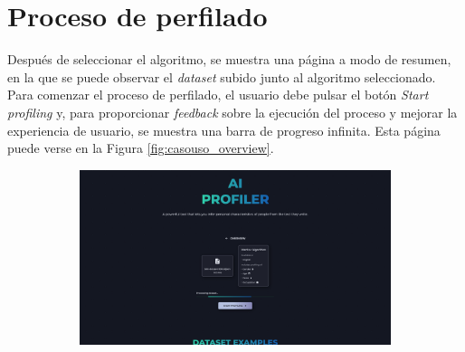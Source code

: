 \section{Proceso de perfilado}
\label{sec:casouso_perfilado}

Después de seleccionar el algoritmo, se muestra una página a modo de resumen, en la que se puede observar el \textit{dataset} subido
junto al algoritmo seleccionado. Para comenzar el proceso de perfilado, el usuario debe pulsar el botón
\textit{Start profiling} y, para proporcionar \textit{feedback} sobre la ejecución del proceso y mejorar la experiencia de usuario,
se muestra una barra de progreso infinita. Esta página puede verse en la Figura \ref{fig:casouso_overview}.

\bigskip
\begin{figure}[H]
	\centering
	\begin{subfigure}[c]{0.74\textwidth}
		\centering
		\includegraphics[width=\textwidth]{imagenes/overview.png}
		\label{fig:casouso_overview_escritorio}
	\end{subfigure}
	\hfill
	\begin{subfigure}[c]{0.21\textwidth}
		\centering

\end{subfigure}
\end{figure}
